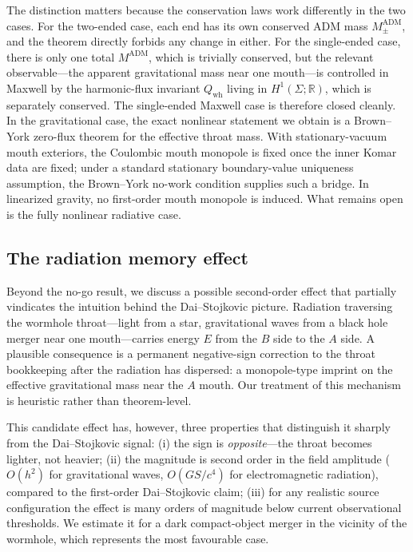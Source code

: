 \documentclass[aps,prd,onecolumn,nofootinbib,superscriptaddress]{revtex4-2}
\begin{document}
The distinction matters because the conservation laws work differently in the
two cases.  For the two-ended case, each end has its own conserved ADM mass
$M_\pm^{\mathrm{ADM}}$, and the theorem directly forbids any change in either.
For the single-ended case, there is only one total $M^{\mathrm{ADM}}$, which is
trivially conserved, but the relevant observable---the apparent gravitational
mass near one mouth---is controlled in Maxwell by the harmonic-flux invariant
$Q_{\mathrm{wh}}$ living in $H^1(\Sigma;\mathbb{R})$, which is separately
conserved.  The single-ended Maxwell case is therefore closed cleanly.  In the
gravitational case, the exact nonlinear statement we obtain is a Brown--York
zero-flux theorem for the effective throat mass.  With stationary-vacuum mouth
exteriors, the Coulombic mouth monopole is fixed once the inner Komar data are
fixed; under a standard stationary boundary-value uniqueness assumption, the
Brown--York no-work condition supplies such a bridge.  In linearized gravity,
no first-order mouth monopole is induced.  What remains open is the fully
nonlinear radiative case.

\subsection*{The radiation memory effect}

Beyond the no-go result, we discuss a possible second-order effect that
partially vindicates the intuition behind the Dai--Stojkovic picture.
Radiation traversing the wormhole throat---light from a star, gravitational
waves from a black hole merger near one mouth---carries energy $E$ from the $B$
side to the $A$ side.  A plausible consequence is a permanent negative-sign
correction to the throat bookkeeping after the radiation has dispersed: a
monopole-type imprint on the effective gravitational mass near the $A$ mouth.
Our treatment of this mechanism is heuristic rather than theorem-level.

This candidate effect has, however, three properties that distinguish it
sharply from the Dai--Stojkovic signal: (i) the sign is \emph{opposite}---the
throat becomes lighter, not heavier; (ii) the magnitude is second order in the
field amplitude ($O(h^2)$ for gravitational waves, $O(G S/c^4)$ for
electromagnetic radiation), compared to the first-order Dai--Stojkovic claim;
(iii) for any realistic source configuration the effect is many orders of
magnitude below current observational thresholds.  We estimate it for a
dark compact-object merger in the vicinity of the wormhole, which represents
the most favourable case.
\end{document}
